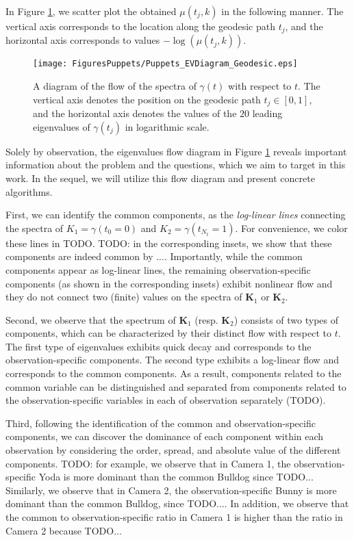 \documentclass[]{article}
\theoremstyle{definition}
\begin{document}
In Figure \ref{fig:Puppets_EVDiagrams_Geodesic}, we scatter plot the obtained $\mu(t_j,k)$ in the following manner.
%
The vertical axis corresponds to the location along the geodesic path $t_j$, and the horizontal axis corresponds to values $-\log(\mu(t_j,k))$.

\begin{figure}[t]
\centering
\texttt{[image: FiguresPuppets/Puppets\_EVDiagram\_Geodesic.eps]} 
\caption {A diagram of the flow of the spectra of $\gamma(t)$ with respect to $t$. The vertical axis denotes the position on the geodesic path $t_j \in [0,1]$, and the horizontal axis denotes the values of the $20$ leading eigenvalues of $\gamma(t_j)$ in logarithmic scale.}
\label{fig:Puppets_EVDiagrams_Geodesic}
\end{figure}


Solely by observation, the eigenvalues flow diagram in Figure \ref{fig:Puppets_EVDiagrams_Geodesic} reveals important information about the problem and the questions, which we aim to target in this work. In the sequel, we will utilize this flow diagram and present concrete algorithms.

First, we can identify the common components, as the \emph{log-linear lines} connecting the spectra of $K_1=\gamma(t_0=0)$ and $K_2=\gamma(t_{N_t}=1)$. For convenience, we color these lines in TODO. TODO: in the corresponding insets, we show that these components are indeed common by .... Importantly, while the common components appear as log-linear lines, the remaining observation-specific components (as shown in the corresponding insets) exhibit nonlinear flow and they do not connect two (finite) values on the spectra of $\mathbf{K}_1$ or $\mathbf{K}_2$. 

Second, we observe that the spectrum of $\mathbf{K}_1$ (resp. $\mathbf{K}_2$) consists of two types of components, which can be characterized by their distinct flow with respect to $t$. The first type of eigenvalues exhibits quick decay and corresponds to the observation-specific components. The second type exhibits a log-linear flow and corresponds to the common components. As a result, components related to the common variable can be distinguished and separated from components related to the observation-specific variables in each of observation separately (TODO). 

Third, following the identification of the common and observation-specific components, we can discover the dominance of each component within each observation by considering the order, spread, and absolute value of the different components.
TODO: for example, we observe that in Camera 1, the observation-specific Yoda is more dominant than the common Bulldog since TODO... Similarly, we observe that in Camera 2, the observation-specific Bunny is more dominant than the common Bulldog, since TODO.... In addition, we observe that the common to observation-specific ratio in Camera 1 is higher than the ratio in Camera 2 because TODO...
\end{document}
